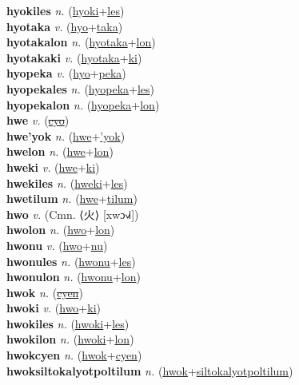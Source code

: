 \textbf{hyokiles} \textit{n.} (\hyperref[hyoki]{hyoki}+\hyperref[les]{les})
 \label{hyokiles} \\
\textbf{hyotaka} \textit{v.} (\hyperref[hyo]{hyo}+\hyperref[taka]{taka})
 \label{hyotaka} \\
\textbf{hyotakalon} \textit{n.} (\hyperref[hyotaka]{hyotaka}+\hyperref[lon]{lon})
 \label{hyotakalon} \\
\textbf{hyotakaki} \textit{v.} (\hyperref[hyotaka]{hyotaka}+\hyperref[ki]{ki})
 \label{hyotakaki} \\
\textbf{hyopeka} \textit{v.} (\hyperref[hyo]{hyo}+\hyperref[peka]{peka})
 \label{hyopeka} \\
\textbf{hyopekales} \textit{n.} (\hyperref[hyopeka]{hyopeka}+\hyperref[les]{les})
 \label{hyopekales} \\
\textbf{hyopekalon} \textit{n.} (\hyperref[hyopeka]{hyopeka}+\hyperref[lon]{lon})
 \label{hyopekalon} \\
\textbf{hwe} \textit{v.} (\hyperref[cyo]{\sout{cyo}})
 \label{hwe} \\
\textbf{hwe'yok} \textit{n.} (\hyperref[hwe]{hwe}+\hyperref['yok]{'yok})
 \label{hwe'yok} \\
\textbf{hwelon} \textit{n.} (\hyperref[hwe]{hwe}+\hyperref[lon]{lon})
 \label{hwelon} \\
\textbf{hweki} \textit{v.} (\hyperref[hwe]{hwe}+\hyperref[ki]{ki})
 \label{hweki} \\
\textbf{hwekiles} \textit{n.} (\hyperref[hweki]{hweki}+\hyperref[les]{les})
 \label{hwekiles} \\
\textbf{hwetilum} \textit{n.} (\hyperref[hwe]{hwe}+\hyperref[tilum]{tilum})
 \label{hwetilum} \\
\textbf{hwo} \textit{v.} (Cmn. ⟨火⟩ [xwɔ˧˩˧])
 \label{hwo} \\
\textbf{hwolon} \textit{n.} (\hyperref[hwo]{hwo}+\hyperref[lon]{lon})
 \label{hwolon} \\
\textbf{hwonu} \textit{v.} (\hyperref[hwo]{hwo}+\hyperref[nu]{nu})
 \label{hwonu} \\
\textbf{hwonules} \textit{n.} (\hyperref[hwonu]{hwonu}+\hyperref[les]{les})
 \label{hwonules} \\
\textbf{hwonulon} \textit{n.} (\hyperref[hwonu]{hwonu}+\hyperref[lon]{lon})
 \label{hwonulon} \\
\textbf{hwok} \textit{n.} (\hyperref[cyen]{\sout{cyen}})
 \label{hwok} \\
\textbf{hwoki} \textit{v.} (\hyperref[hwo]{hwo}+\hyperref[ki]{ki})
 \label{hwoki} \\
\textbf{hwokiles} \textit{n.} (\hyperref[hwoki]{hwoki}+\hyperref[les]{les})
 \label{hwokiles} \\
\textbf{hwokilon} \textit{n.} (\hyperref[hwoki]{hwoki}+\hyperref[lon]{lon})
 \label{hwokilon} \\
\textbf{hwokcyen} \textit{n.} (\hyperref[hwok]{hwok}+\hyperref[cyen]{cyen})
 \label{hwokcyen} \\
\textbf{hwoksiltokalyotpoltilum} \textit{n.} (\hyperref[hwok]{hwok}+\hyperref[siltokalyotpoltilum]{siltokalyotpoltilum})
 \label{hwoksiltokalyotpoltilum} \\
